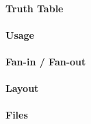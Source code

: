 \paragraph{Truth Table}
%

\paragraph{Usage}

\paragraph{Fan-in / Fan-out}

\paragraph{Layout}

\paragraph{Files}

\clearpage

